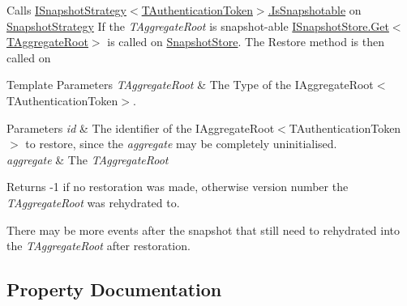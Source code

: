 Calls \hyperlink{interfaceCqrs_1_1Snapshots_1_1ISnapshotStrategy_a02121821312c4ce2811b31eeaffabe51_a02121821312c4ce2811b31eeaffabe51}{I\+Snapshot\+Strategy$<$\+T\+Authentication\+Token$>$.\+Is\+Snapshotable} on \hyperlink{classCqrs_1_1Snapshots_1_1SnapshotRepository_a7d65b4df10d0b6f75c911a9b6d59b3ba_a7d65b4df10d0b6f75c911a9b6d59b3ba}{Snapshot\+Strategy} If the {\itshape T\+Aggregate\+Root}  is snapshot-\/able \hyperlink{interfaceCqrs_1_1Snapshots_1_1ISnapshotStore_ab7bd163fc9cd5c3bd5911679030be403_ab7bd163fc9cd5c3bd5911679030be403}{I\+Snapshot\+Store.\+Get$<$\+T\+Aggregate\+Root$>$} is called on \hyperlink{classCqrs_1_1Snapshots_1_1SnapshotRepository_aba01e9f20eb41e6f3e4476a7f3182275_aba01e9f20eb41e6f3e4476a7f3182275}{Snapshot\+Store}. The Restore method is then called on 


\begin{DoxyTemplParams}{Template Parameters}
{\em T\+Aggregate\+Root} & The Type of the I\+Aggregate\+Root$<$\+T\+Authentication\+Token$>$.\\
\hline
\end{DoxyTemplParams}

\begin{DoxyParams}{Parameters}
{\em id} & The identifier of the I\+Aggregate\+Root$<$\+T\+Authentication\+Token$>$ to restore, since the {\itshape aggregate}  may be completely uninitialised.\\
\hline
{\em aggregate} & The {\itshape T\+Aggregate\+Root} \\
\hline
\end{DoxyParams}
\begin{DoxyReturn}{Returns}
-\/1 if no restoration was made, otherwise version number the {\itshape T\+Aggregate\+Root}  was rehydrated to.
\end{DoxyReturn}


There may be more events after the snapshot that still need to rehydrated into the {\itshape T\+Aggregate\+Root}  after restoration.

\subsection{Property Documentation}
\mbox{\label{classCqrs_1_1Snapshots_1_1SnapshotRepository_a833748fa79fd234067b61927c57bc60f_a833748fa79fd234067b61927c57bc60f}} 
